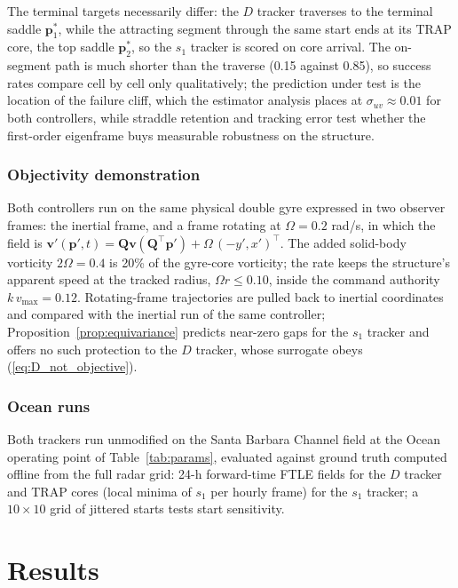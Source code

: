 \documentclass[lettersize,journal]{IEEEtran}
\begin{document}
The terminal targets necessarily differ: the $D$ tracker traverses to
the terminal saddle $\mathbf{p}^*_1$, while the attracting segment
through the same start ends at its TRAP core, the top saddle
$\mathbf{p}^*_2$, so the $s_1$ tracker is scored on core arrival. The
on-segment path is much shorter than the traverse (0.15 against 0.85),
so success rates compare cell by cell only qualitatively; the
prediction under test is the location of the failure cliff, which the
estimator analysis places at $\sigma_{uv} \approx 0.01$ for both
controllers, while straddle retention and tracking error test whether
the first-order eigenframe buys measurable robustness on the
structure.

\subsubsection{Objectivity demonstration}
Both controllers run on the same physical double gyre expressed in two
observer frames: the inertial frame, and a frame rotating at
$\Omega = 0.2$ rad/s, in which the field is
$\mathbf{v}'(\mathbf{p}', t) = \mathbf{Q}\mathbf{v}(\mathbf{Q}^\top
\mathbf{p}') + \Omega\,(-y', x')^\top$. The added solid-body vorticity
$2\Omega = 0.4$ is 20\% of the gyre-core vorticity; the rate keeps the
structure's apparent speed at the tracked radius, $\Omega r \leq 0.10$,
inside the command authority $k\,v_{\max} = 0.12$. Rotating-frame
trajectories are pulled back to inertial coordinates and compared with
the inertial run of the same controller;
Proposition~\ref{prop:equivariance} predicts near-zero gaps for the
$s_1$ tracker and offers no such protection to the $D$ tracker, whose
surrogate obeys (\ref{eq:D_not_objective}).

\subsubsection{Ocean runs}
Both trackers run unmodified on the Santa Barbara Channel field at the
Ocean operating point of Table~\ref{tab:params}, evaluated against
ground truth computed offline from the full radar grid: 24-h
forward-time FTLE fields for the $D$ tracker and TRAP cores (local
minima of $s_1$ per hourly frame) for the $s_1$ tracker; a $10 \times
10$ grid of jittered starts tests start sensitivity.

\section{Results}
\label{sec:results}
\end{document}

